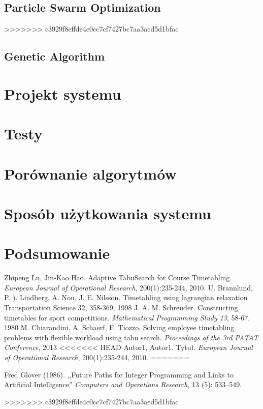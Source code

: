 \documentclass[11pt]{report}
\begin{document}
\section{Particle Swarm Optimization}
>>>>>>> c3929f8effde4c0cc7cf7427bc7aa3aed5d1bfac
\section{Genetic Algorithm}
\chapter{Projekt systemu}
\chapter{Testy}
\chapter{Porównanie algorytmów}
\chapter{Sposób użytkowania systemu}
\chapter{Podsumowanie}

\begin{thebibliography}{2}
 Zhipeng Lu, Jin-Kao Hao. Adaptive TabuSearch for Course Timetabling.  \emph{European Journal of Operational Research}, 200(1):235-244, 2010.
 U. Brannlund, P. ). Lindberg, A. Nou, J. E. Nilsson. Timetabling using lagrangian relaxation Transportation Science 32, 358-369, 1998
 J. A. M. Schreuder. Constructing timetables for sport competitions. \emph{Mathematical Programming Study 13}, 58-67, 1980
 M. Chiarandini, A. Schaerf, F. Tiozzo. Solving employee timetabling problems with flexible workload using tabu search. \emph{Proceedings of the 3rd PATAT Conference}, 2013
<<<<<<< HEAD
 Autor1, Autor1. Tytuł.  \emph{European Journal of Operational Research}, 200(1):235-244, 2010.
=======

 Fred Glover (1986). ,,Future Paths for Integer Programming and Links to Artificial Intelligence'' \emph{Computers and Operations Research}, 13 (5): 533–549.

>>>>>>> c3929f8effde4c0cc7cf7427bc7aa3aed5d1bfac
\end{thebibliography}
\end{document}
